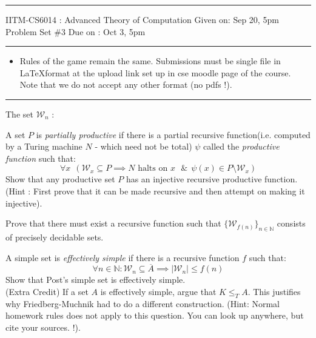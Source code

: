 \documentclass[addpoints,12pt]{exam}
\renewcommand{\W}{\mathcal{W}}
\begin{document}
\hrule
\vspace{3mm}
\noindent
{\sf IITM-CS6014 : Advanced Theory of Computation  \hfill Given on: Sep 20, 5pm}
\vspace{3mm}\\
\noindent
{\sf Problem Set \#3 \hfill Due on : Oct 3, 5pm}
\vspace{3mm}
\hrule
{\small
\begin{itemize}
\item Rules of the game remain the same. Submissions must be single file in \LaTeX format at the upload link set up in cse moodle page of the course. Note that we do not accept any other format (no pdfs !).
\end{itemize}}
\hrule

\begin{questions}
\question[10] The set $\mathcal{W}_n$ :

\question[10] A set $P$ is \textit{partially productive} if there is a partial recursive function(i.e. computed by a Turing machine $N$ - which need not be total) $\psi$ called the {\em productive function} such that:
\[ \forall x ~~\left( \mathcal{W}_x \subseteq P \implies N \textrm{ halts on $x$ } 
\&~~\psi(x) \in P \setminus \mathcal{W}_x \right) \]
Show that any productive set $P$ has an injective recursive productive function. \\ (Hint : First prove that it can be made recursive and then attempt on making it injective).

\question[5]
Prove that there must exist a recursive function such that $\{ \W_{f(n)} \}_{n \in \mathbb{N}}$ consists of precisely decidable sets.

\question[5]
A simple set is {\em effectively simple} if there is a recursive function $f$ such that:
\[ \forall n\in \mathbb{N} : \W_n \subseteq \overline{A} \implies |\W_n| \le f(n) \]
Show that Post's simple set is effectively simple. \\[2mm]
(Extra Credit) If a set $A$ is effectively simple, argue that $K \le_T A$. This justifies why Friedberg-Muchnik had to do a different construction. 
(Hint: Normal homework rules does not apply to this question. You can look up anywhere, but cite your sources. !).


\end{questions}
\end{document}
